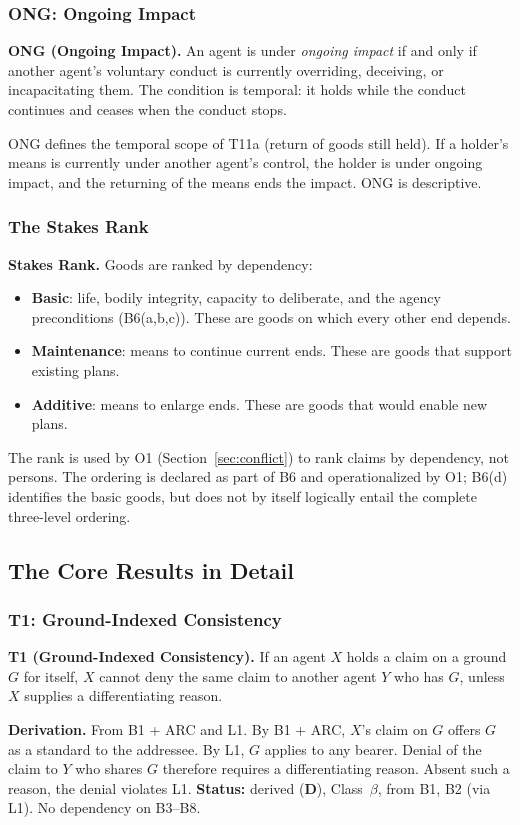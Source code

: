 \documentclass[11pt]{article}
\newcommand{\statusD}{\textcolor{stD}{\textbf{D}}}
\newcommand{\cb}{\texorpdfstring{Class~$\beta$}{Class beta}}
\begin{document}
\subsubsection{ONG: Ongoing Impact}
\begin{paperbox}
\textbf{ONG (Ongoing Impact).} An agent is under \emph{ongoing impact} if and only if another agent's voluntary conduct is currently overriding, deceiving, or incapacitating them. The condition is temporal: it holds while the conduct continues and ceases when the conduct stops.
\end{paperbox}
ONG defines the temporal scope of T11a (return of goods still held). If a holder's means is currently under another agent's control, the holder is under ongoing impact, and the returning of the means ends the impact. ONG is descriptive.

\subsubsection{The Stakes Rank}
\begin{paperbox}
\textbf{Stakes Rank.} Goods are ranked by dependency:
\begin{itemize}
\item \textbf{Basic}: life, bodily integrity, capacity to deliberate, and the agency preconditions (B6(a,b,c)). These are goods on which every other end depends.
\item \textbf{Maintenance}: means to continue current ends. These are goods that support existing plans.
\item \textbf{Additive}: means to enlarge ends. These are goods that would enable new plans.
\end{itemize}
The rank is used by O1 (Section~\ref{sec:conflict}) to rank claims by dependency, not persons. The ordering is declared as part of B6 and operationalized by O1; B6(d) identifies the basic goods, but does not by itself logically entail the complete three-level ordering.
\end{paperbox}

\subsection{The Core Results in Detail}
\subsubsection{T1: Ground-Indexed Consistency}
\begin{paperbox}
\textbf{T1 (Ground-Indexed Consistency).} If an agent $X$ holds a claim on a ground $G$ for itself, $X$ cannot deny the same claim to another agent $Y$ who has $G$, unless $X$ supplies a differentiating reason.
\end{paperbox}
\textbf{Derivation.} From B1 + ARC and L1. By B1 + ARC, $X$'s claim on $G$ offers $G$ as a standard to the addressee. By L1, $G$ applies to any bearer. Denial of the claim to $Y$ who shares $G$ therefore requires a differentiating reason. Absent such a reason, the denial violates L1. \textbf{Status:} derived (\statusD{}), \cb{}, from B1, B2 (via L1). No dependency on B3--B8.
\end{document}
